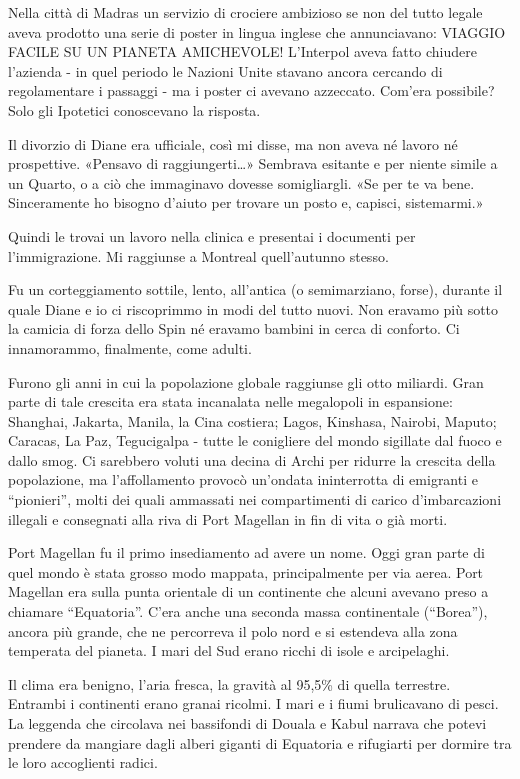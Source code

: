 Nella città di Madras un servizio di crociere ambizioso se non del tutto
legale aveva prodotto una serie di poster in lingua inglese che
annunciavano: {VIAGGIO FACILE SU UN PIANETA AMICHEVOLE}! L'Interpol
aveva fatto chiudere l'azienda - in quel periodo le Nazioni Unite
stavano ancora cercando di regolamentare i passaggi - ma i poster ci
avevano azzeccato. Com'era possibile? Solo gli Ipotetici conoscevano la
risposta.

Il divorzio di Diane era ufficiale, così mi disse, ma non aveva né
lavoro né prospettive. «Pensavo di raggiungerti\ldots» Sembrava esitante
e per niente simile a un Quarto, o a ciò che immaginavo dovesse
somigliargli. «Se per te va bene. Sinceramente ho bisogno d'aiuto per
trovare un posto e, capisci, sistemarmi.»

Quindi le trovai un lavoro nella clinica e presentai i documenti per
l'immigrazione. Mi raggiunse a Montreal quell'autunno stesso.

\separatorefiori

Fu un corteggiamento sottile, lento, all'antica (o semimarziano, forse),
durante il quale Diane e io ci riscoprimmo in modi del tutto nuovi. Non
eravamo più sotto la camicia di forza dello Spin né eravamo bambini in
cerca di conforto. Ci innamorammo, finalmente, come adulti.

Furono gli anni in cui la popolazione globale raggiunse gli otto
miliardi. Gran parte di tale crescita era stata incanalata nelle
megalopoli in espansione: Shanghai, Jakarta, Manila, la Cina costiera;
Lagos, Kinshasa, Nairobi, Maputo; Caracas, La Paz, Tegucigalpa - tutte
le conigliere del mondo sigillate dal fuoco e dallo smog. Ci sarebbero
voluti una decina di Archi per ridurre la crescita della popolazione, ma
l'affollamento provocò un'ondata ininterrotta di emigranti e
``pionieri'', molti dei quali ammassati nei compartimenti di carico
d'imbarcazioni illegali e consegnati alla riva di Port Magellan in fin
di vita o già morti.

Port Magellan fu il primo insediamento ad avere un nome. Oggi gran parte
di quel mondo è stata grosso modo mappata, principalmente per via aerea.
Port Magellan era sulla punta orientale di un continente che alcuni
avevano preso a chiamare ``Equatoria''. C'era anche una seconda massa
continentale (``Borea''), ancora più grande, che ne percorreva il polo
nord e si estendeva alla zona temperata del pianeta. I mari del Sud
erano ricchi di isole e arcipelaghi.

Il clima era benigno, l'aria fresca, la gravità al 95,5\% di quella
terrestre. Entrambi i continenti erano granai ricolmi. I mari e i fiumi
brulicavano di pesci. La leggenda che circolava nei bassifondi di Douala
e Kabul narrava che potevi prendere da mangiare dagli alberi giganti di
Equatoria e rifugiarti per dormire tra le loro accoglienti radici.

